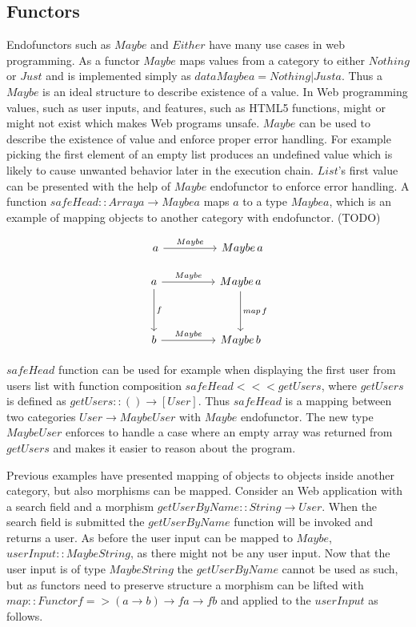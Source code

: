 \documentclass[article]{aaltoseries}
\begin{document}
    

  \subsection{Functors}
    Endofunctors such as $Maybe$ and $Either$ have many use cases in web
    programming. As a functor $Maybe$ maps values from a category to either
    $Nothing$ or $Just$ and is implemented simply as $data Maybe a = Nothing | Just
    a$. Thus a $Maybe$ is an ideal structure to describe existence of a value. In
    Web programming values, such as user inputs, and features, such as HTML5
    functions, might or might not exist which makes Web programs unsafe. $Maybe$
    can be used to describe the existence of value and enforce proper error
    handling. For example picking the first element of an empty list produces an
    undefined value which is likely to cause unwanted behavior later in the
    execution chain. $List$'s first value can be presented with the help of $Maybe$
    endofunctor to enforce error handling. A function $safeHead :: Array a \rightarrow
    Maybe a$ maps $a$ to a type $Maybe a$, which is an example of mapping objects to
    another category with endofunctor. (TODO)

    \[
      \begin{tikzcd}[row sep=huge, column sep=huge]
        a \arrow[r, "Maybe"]
        & Maybe\, a
      \end{tikzcd}
    \]

    \[
      \begin{tikzcd}[row sep=huge, column sep=huge]
        a \arrow[r, "Maybe"]
        \arrow[d, "f"]
        & Maybe\, a
        \arrow[d, "map\, f"]
        \\
        b \arrow[r, "Maybe"]
        & Maybe\, b
      \end{tikzcd}
    \]

    $safeHead$ function can be used for example when displaying the first user
    from users list with function composition $safeHead <<< getUsers$, where
    $getUsers$ is defined as $getUsers :: () \rightarrow [User]$. Thus $safeHead$ is a mapping
    between two categories $User \rightarrow Maybe User$ with $Maybe$ endofunctor. The new
    type $Maybe User$ enforces to handle a case where an empty array was returned
    from $getUsers$ and makes it easier to reason about the program.
 
    Previous examples have presented mapping of objects to objects inside another
    category, but also morphisms can be mapped. Consider an Web application with a
    search field and a morphism $getUserByName :: String \rightarrow User$. When the search
    field is submitted the $getUserByName$ function will be invoked and returns a
    user. As before the user input can be mapped to $Maybe$, $userInput :: Maybe
    String$, as there might not be any user input. Now that the user input is of type
    $Maybe String$ the $getUserByName$ cannot be used as such, but as functors need to
    preserve structure a morphism can be lifted with $map :: Functor f => (a \rightarrow b) \rightarrow f
    a \rightarrow f b$ and applied to the $userInput$ as follows. 
\end{document}
